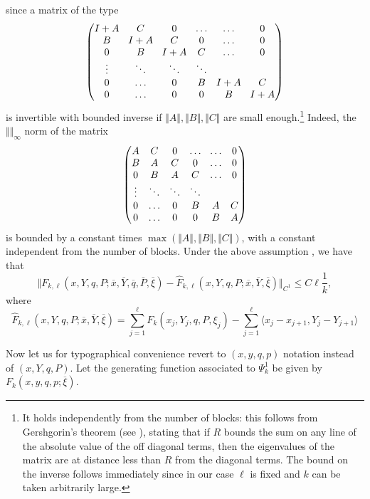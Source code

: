 \documentclass[JEP,XML,SOM,NoFloatCountersInSection,Unicode,published]{cedram}
\numberwithin{equation}{section}
\let \F F
\theoremstyle{plain}
\theoremstyle{definition}
\theoremstyle{remark}
\begin{document}
since a matrix of the type
\[\arraycolsep4.5pt
\begin{pmatrix} I +A&C & 0 &\ldots & \ldots & 0 \\
B& I+A & C &0& \ldots & 0 \\
0 & B & I+A& C&\ldots &0\\
\vdots &\ddots & \ddots & \ddots \\
0 & \ldots &0& B& I+A & C \\
0 &\ldots & 0&0& B& I+A
\end{pmatrix}
\]
is invertible with bounded inverse if $ \Vert A \Vert, \Vert B \Vert, \Vert C \Vert $ are small enough.\footnote{It holds independently from the number of blocks: this follows from Gershgorin's theorem (see \cite{Gershgorin, Varga}), stating that if $R$ bounds the sum on any line of the absolute value of the off diagonal terms, then the eigenvalues of the matrix are at distance less than $R$ from the diagonal terms. The bound on the inverse follows immediately since in our case $\ell$ is fixed and $k$ can be taken arbitrarily large.}
Indeed, the $ \Vert \Vert_\infty$ norm of the matrix
\[\arraycolsep4.5pt
\begin{pmatrix} A&C & 0 &\ldots & \ldots & 0 \\
B& A & C &0& \ldots & 0 \\
0 & B & A& C&\ldots &0\\
\vdots &\ddots & \ddots & \ddots \\
0 & \ldots &0& B& A & C \\
0 &\ldots & 0&0& B& A
\end{pmatrix}
\]
is bounded by a constant times $\max (\Vert A \Vert, \Vert B \Vert, \Vert C \Vert)$, with a constant independent from the number of blocks.
Under the above assumption \thetag{$\star$}, we have that
\[
\Vert \F_{k,\ell} (x,Y,q,P;\overline x, \overline Y, \overline q, \overline P, \overline \xi) - \widehat \F_{k,\ell} (x,Y,q,P;\overline x, \overline Y, \overline \xi) \Vert_{C^1} \leq C\ell \frac{1}{k},
\]
where
\[
\widehat \F_{k,\ell} (x,Y,q,P;\overline x, \overline Y, \overline \xi)=
\sum_{j=1}^{\ell}F_k(x_{j},Y_{j},q,P,\xi_{j}) -\sum_{j=1}^{\ell} \langle x_{j}-x_{j+1}, Y_{j}-Y_{j+1}\rangle
\]

Now let us for typographical convenience revert to $(x,y,q,p)$ notation instead of $(x,Y,q,P)$. Let
the generating function associated to $\Psi_k^1$ be given by
$F_k(x,y,q,p; \overline \xi)$.
\end{document}
